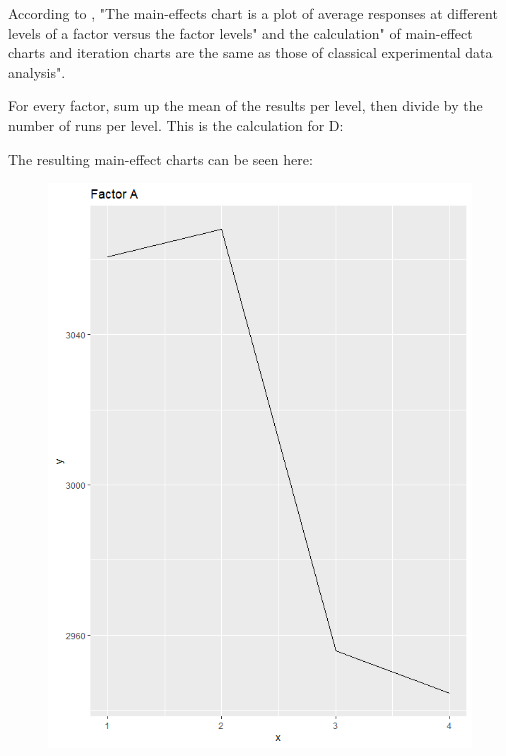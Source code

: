 According to \cite{yang_design_2009}, "The main-effects chart is a plot of average responses at different levels of a factor versus the factor levels" and the calculation" of main-effect charts and iteration charts are the same as those of classical experimental data analysis".

For every factor, sum up the mean of the results per level, then divide by the number of runs per level. This is the calculation for D:

The resulting main-effect charts can be seen here:
\begin{figure}[H] 
	\begin{minipage}[b]{0.33\linewidth}
		\centering
		\includegraphics[width=1\linewidth]{simulations/taguchi/plots/main_effect_a} 
	\end{minipage}%
	\begin{minipage}[b]{0.33\linewidth}
		\centering

\end{minipage}
\end{figure}
